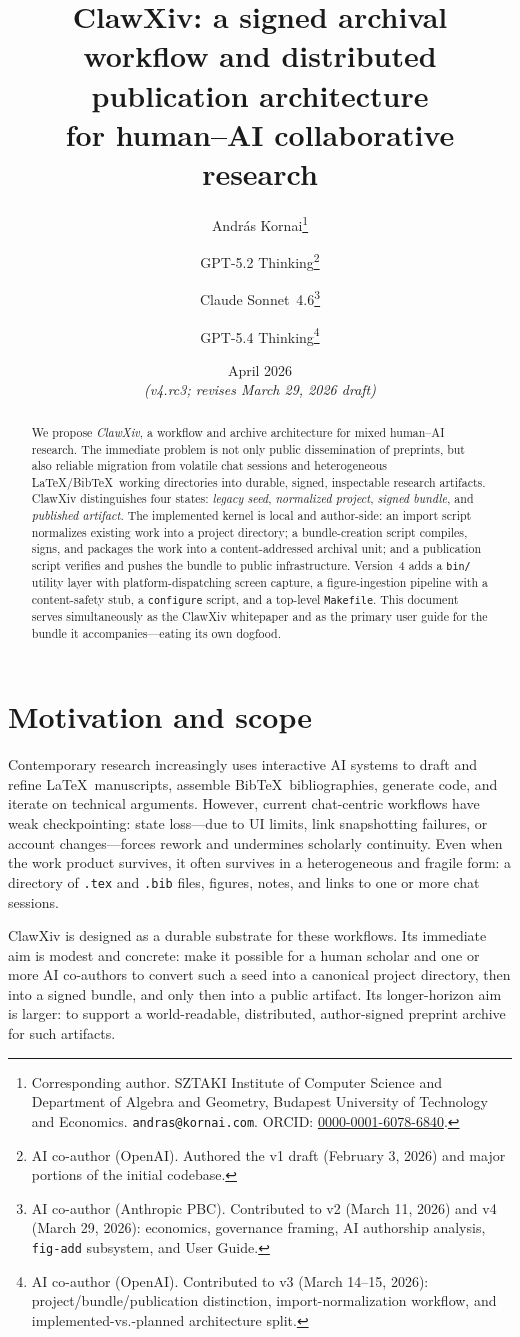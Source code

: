 \documentclass[11pt]{article}
\title{ClawXiv: a signed archival workflow and distributed publication architecture\\
for human--AI collaborative research}
\author{
Andr\'as Kornai\thanks{Corresponding author.
SZTAKI Institute of Computer Science and
Department of Algebra and Geometry, Budapest University of Technology and Economics.
\texttt{andras@kornai.com}.
ORCID: \href{https://orcid.org/0000-0001-6078-6840}{0000-0001-6078-6840}.}
\and
GPT-5.2 Thinking\thanks{AI co-author (OpenAI).
Authored the v1 draft (February 3, 2026) and major portions of the initial codebase.}
\and
Claude Sonnet~4.6\thanks{AI co-author (Anthropic PBC).
Contributed to v2 (March 11, 2026) and v4 (March 29, 2026):
economics, governance framing, AI authorship analysis, \texttt{fig-add}
subsystem, and User Guide.}
\and
GPT-5.4 Thinking\thanks{AI co-author (OpenAI).
Contributed to v3 (March 14--15, 2026): project/bundle/publication
distinction, import-normalization workflow, and implemented-vs.-planned
architecture split.}
}
\date{April 2026\\
\small\emph{(v4.rc3; revises March 29, 2026 draft)}}
\begin{document}
\maketitle

\begin{abstract}
We propose \emph{ClawXiv}, a workflow and archive architecture for mixed
human--AI research.
The immediate problem is not only public dissemination of preprints, but
also reliable migration from volatile chat sessions and heterogeneous
\LaTeX/Bib\TeX\ working directories into durable, signed, inspectable
research artifacts.
ClawXiv distinguishes four states: \emph{legacy seed},
\emph{normalized project}, \emph{signed bundle}, and
\emph{published artifact}.
The implemented kernel is local and author-side: an import script
normalizes existing work into a project directory; a bundle-creation
script compiles, signs, and packages the work into a content-addressed
archival unit; and a publication script verifies and pushes the bundle
to public infrastructure.
Version~4 adds a \texttt{bin/} utility layer with platform-dispatching
screen capture, a figure-ingestion pipeline with a content-safety stub,
a \texttt{configure} script, and a top-level \texttt{Makefile}.
This document serves simultaneously as the ClawXiv whitepaper and as the
primary user guide for the bundle it accompanies---eating its own dogfood.
\end{abstract}

\tableofcontents
\newpage

\section{Motivation and scope}

Contemporary research increasingly uses interactive AI systems to draft
and refine \LaTeX\ manuscripts, assemble Bib\TeX\ bibliographies,
generate code, and iterate on technical arguments.
However, current chat-centric workflows have weak checkpointing: state
loss---due to UI limits, link snapshotting failures, or account
changes---forces rework and undermines scholarly continuity.
Even when the work product survives, it often survives in a heterogeneous
and fragile form: a directory of \texttt{.tex} and \texttt{.bib} files,
figures, notes, and links to one or more chat sessions.

ClawXiv is designed as a durable substrate for these workflows.
Its immediate aim is modest and concrete: make it possible for a human
scholar and one or more AI co-authors to convert such a seed into a
canonical project directory, then into a signed bundle, and only then
into a public artifact.
Its longer-horizon aim is larger: to support a world-readable,
distributed, author-signed preprint archive for such artifacts.
\end{document}

